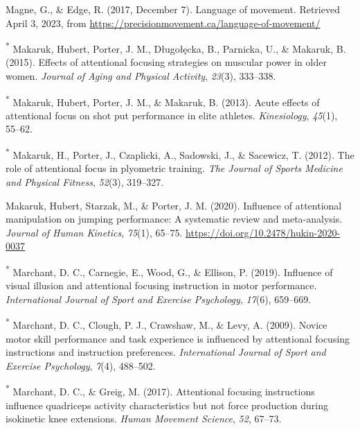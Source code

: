 \documentclass[
  man, donotrepeattitle,floatsintext]{apa7}
\newlength{\cslhangindent}
\newlength{\cslentryspacingunit} %
\newenvironment{CSLReferences}[2] %
 {%
  \setlength{\parindent}{0pt}
  \ifodd #1
  \let\oldpar\par
  \def\par{\hangindent=\cslhangindent\oldpar}
  \fi
  \setlength{\parskip}{#2\cslentryspacingunit}
 }%
 {}
\begin{document}
\begin{CSLReferences}{1}{0}
\leavevmode{}%
Magne, G., \& Edge, R. (2017, December 7). Language of movement. Retrieved April 3, 2023, from \url{https://precisionmovement.ca/language-of-movement/}

\leavevmode{}%
\textsuperscript{*} Makaruk, Hubert, Porter, J. M., Długołęcka, B., Parnicka, U., \& Makaruk, B. (2015). Effects of attentional focusing strategies on muscular power in older women. \emph{Journal of Aging and Physical Activity}, \emph{23}(3), 333--338.

\leavevmode{}%
\textsuperscript{*} Makaruk, Hubert, Porter, J. M., \& Makaruk, B. (2013). Acute effects of attentional focus on shot put performance in elite athletes. \emph{Kinesiology}, \emph{45}(1), 55--62.

\leavevmode{}%
\textsuperscript{*} Makaruk, H., Porter, J., Czaplicki, A., Sadowski, J., \& Sacewicz, T. (2012). The role of attentional focus in plyometric training. \emph{The Journal of Sports Medicine and Physical Fitness}, \emph{52}(3), 319--327.

\leavevmode{}%
Makaruk, Hubert, Starzak, M., \& Porter, J. M. (2020). Influence of attentional manipulation on jumping performance: {A} systematic review and meta-analysis. \emph{Journal of Human Kinetics}, \emph{75}(1), 65--75. \url{https://doi.org/10.2478/hukin-2020-0037}

\leavevmode{}%
\textsuperscript{*} Marchant, D. C., Carnegie, E., Wood, G., \& Ellison, P. (2019). Influence of visual illusion and attentional focusing instruction in motor performance. \emph{International Journal of Sport and Exercise Psychology}, \emph{17}(6), 659--669.

\leavevmode{}%
\textsuperscript{*} Marchant, D. C., Clough, P. J., Crawshaw, M., \& Levy, A. (2009). Novice motor skill performance and task experience is influenced by attentional focusing instructions and instruction preferences. \emph{International Journal of Sport and Exercise Psychology}, \emph{7}(4), 488--502.

\leavevmode{}%
\textsuperscript{*} Marchant, D. C., \& Greig, M. (2017). Attentional focusing instructions influence quadriceps activity characteristics but not force production during isokinetic knee extensions. \emph{Human Movement Science}, \emph{52}, 67--73.


\end{CSLReferences}
\end{document}

